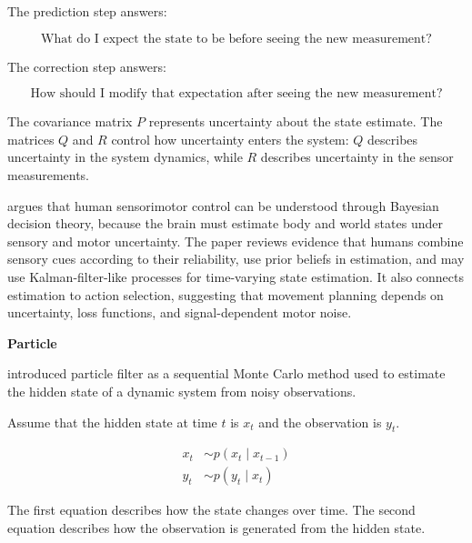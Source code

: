 \documentclass{book}
\providecommand{\ProjectDeepHeading}[2]{%
    \par\medskip\noindent\textbf{#2}\par\smallskip
}
\begin{document}
        The prediction step answers:
        
        \[
            \text{What do I expect the state to be before seeing the new measurement?}
        \]
        
        The correction step answers:
        
        \[
            \text{How should I modify that expectation after seeing the new measurement?}
        \]
        
        The covariance matrix \(P\) represents uncertainty about the state estimate.
        The matrices \(Q\) and \(R\) control how uncertainty enters the system: \(Q\) describes uncertainty in the system dynamics, while \(R\) describes uncertainty in the sensor measurements.


\cite{wolpert-2007-probabilistic-models-in-human-sensorimotor-control} argues that human sensorimotor control can be understood through Bayesian decision theory, because the brain must estimate body and world states under sensory and motor uncertainty. The paper reviews evidence that humans combine sensory cues according to their reliability, use prior beliefs in estimation, and may use Kalman-filter-like processes for time-varying state estimation. It also connects estimation to action selection, suggesting that movement planning depends on uncertainty, loss functions, and signal-dependent motor noise.

\ProjectDeepHeading{7}{Particle}


\cite{gordon-1993-novel-approach-to-nonlinear-non-gaussian-bayesian-state-estimation} introduced particle filter as a sequential Monte Carlo method used to estimate the hidden state of a dynamic system from noisy observations.
    
    Assume that the hidden state at time $t$ is $x_t$ and the observation is $y_t$.
    
    \begin{align}
        x_t &\sim p(x_t \mid x_{t-1}) \\
        y_t &\sim p(y_t \mid x_t)
    \end{align}
    
    The first equation describes how the state changes over time.
    The second equation describes how the observation is generated from the hidden state.
    
\end{document}
